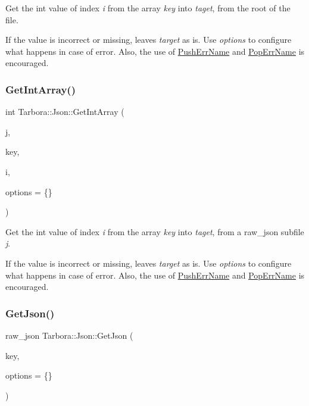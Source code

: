 Get the int value of index {\itshape i} from the array {\itshape key} into {\itshape taget}, from the root of the file. 

If the value is incorrect or missing, leaves {\itshape target} as is. Use {\itshape options} to configure what happens in case of error. Also, the use of \hyperlink{classTarbora_1_1Json_a061eac4f16dac3b9b3a26a66de0ea8f0}{Push\+Err\+Name} and \hyperlink{classTarbora_1_1Json_a14019f06d3bd76edd6a6e78134519d11}{Pop\+Err\+Name} is encouraged. \mbox{\label{classTarbora_1_1Json_a7f00b9a316dcfa152db52d2128333b7c}} 
\subsubsection{\texorpdfstring{Get\+Int\+Array()}{GetIntArray()}\hspace{0.1cm}{\footnotesize\ttfamily [2/2]}}
{\footnotesize\ttfamily int Tarbora\+::\+Json\+::\+Get\+Int\+Array (\begin{DoxyParamCaption}\item[{raw\+\_\+json}]{j,  }\item[{const char $\ast$}]{key,  }\item[{int}]{i,  }\item[{\hyperlink{structTarbora_1_1JsonOptions}{Json\+Options}}]{options = {\ttfamily \{\}} }\end{DoxyParamCaption})}



Get the int value of index {\itshape i} from the array {\itshape key} into {\itshape taget}, from a raw\+\_\+json subfile {\itshape j}. 

If the value is incorrect or missing, leaves {\itshape target} as is. Use {\itshape options} to configure what happens in case of error. Also, the use of \hyperlink{classTarbora_1_1Json_a061eac4f16dac3b9b3a26a66de0ea8f0}{Push\+Err\+Name} and \hyperlink{classTarbora_1_1Json_a14019f06d3bd76edd6a6e78134519d11}{Pop\+Err\+Name} is encouraged. \mbox{\label{classTarbora_1_1Json_a30c549b1306baccb78083771f30e5082}} 
\subsubsection{\texorpdfstring{Get\+Json()}{GetJson()}\hspace{0.1cm}{\footnotesize\ttfamily [1/3]}}
{\footnotesize\ttfamily raw\+\_\+json Tarbora\+::\+Json\+::\+Get\+Json (\begin{DoxyParamCaption}\item[{const char $\ast$}]{key,  }\item[{\hyperlink{structTarbora_1_1JsonOptions}{Json\+Options}}]{options = {\ttfamily \{\}} }\end{DoxyParamCaption})}



